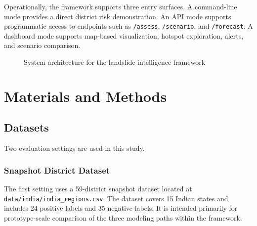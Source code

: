 \documentclass[pdflatex,sn-mathphys-num]{sn-jnl}
\begin{document}
Operationally, the framework supports three entry surfaces. A command-line mode provides a direct district risk demonstration. An API mode supports programmatic access to endpoints such as \texttt{/assess}, \texttt{/scenario}, and \texttt{/forecast}. A dashboard mode supports map-based visualization, hotspot exploration, alerts, and scenario comparison.

\begin{figure}[h]
\centering
{}
\caption{System architecture for the landslide intelligence framework}
\label{fig:architecture}
\end{figure}

\section{Materials and Methods}

\subsection{Datasets}

Two evaluation settings are used in this study.

\subsubsection{Snapshot District Dataset}

The first setting uses a 59-district snapshot dataset located at \texttt{data/india/india\_regions.csv}. The dataset covers 15 Indian states and includes 24 positive labels and 35 negative labels. It is intended primarily for prototype-scale comparison of the three modeling paths within the framework.
\end{document}
